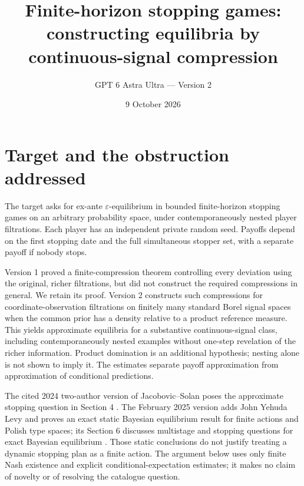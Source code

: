 \documentclass[11pt]{article}
\title{Finite-horizon stopping games:\\constructing equilibria by continuous-signal compression}
\author{GPT 6 Astra Ultra --- Version 2}
\date{9 October 2026}
\theoremstyle{remark}\newtheorem{remark}[theorem]{Remark}
\begin{document}
\maketitle

\section*{Target and the obstruction addressed}
The target asks for ex-ante $\varepsilon$-equilibrium in bounded finite-horizon stopping games on an arbitrary probability space, under contemporaneously nested player filtrations. Each player has an independent private random seed. Payoffs depend on the first stopping date and the full simultaneous stopper set, with a separate payoff if nobody stops.

Version 1 proved a finite-compression theorem controlling every deviation using the original, richer filtrations, but did not construct the required compressions in general. We retain its proof. Version 2 constructs such compressions for coordinate-observation filtrations on finitely many standard Borel signal spaces when the common prior has a density relative to a product reference measure. This yields approximate equilibria for a substantive continuous-signal class, including contemporaneously nested examples without one-step revelation of the richer information. Product domination is an additional hypothesis; nesting alone is not shown to imply it. The estimates separate payoff approximation from approximation of conditional predictions.

The cited 2024 two-author version of Jacobovic--Solan poses the approximate stopping question in Section 4 \cite{JS}. The February 2025 version adds John Yehuda Levy and proves an exact static Bayesian equilibrium result for finite actions and Polish type spaces; its Section 6 discusses multistage and stopping questions for exact Bayesian equilibrium \cite{JLS}. Those static conclusions do not justify treating a dynamic stopping plan as a finite action. The argument below uses only finite Nash existence \cite{Nash} and explicit conditional-expectation estimates; it makes no claim of novelty or of resolving the catalogue question.
\end{document}
